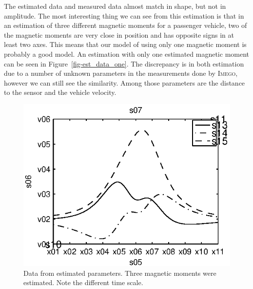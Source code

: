 The estimated data and measured data almost match in shape, but not in amplitude. The most interesting thing we can see from this estimation is that in an estimation of three different magnetic moments for a passenger vehicle, two of the magnetic moments are very close in position and has opposite signs in at least two axes. This means that our model of using only one magnetic moment is probably a good model. An estimation with only one estimated magnetic moment can be seen in Figure~\ref{fig-est_data_one}. The discrepancy is in both estimation due to a number of unknown parameters in the measurements done by \textsc{Imego}, however we can still see the similarity. Among those parameters are the distance to the sensor and the vehicle velocity.

\begin{subfigures}
\begin{figure}[!htb]
  \centering
  \begin{minipage}{0.45\linewidth}
  \centering
   
   \includegraphics[width=\linewidth]{images/meas_data_three}
  \caption[Data from estimated parameters, three magnetic moments]{Data from estimated parameters. Three magnetic moments were estimated. Note the different time scale.}
  \label{fig-leastsqdata}
  \end{minipage}\hfill
  \begin{minipage}{0.45\linewidth}
   \centering
     

\end{minipage}
\end{figure}
\end{subfigures}
